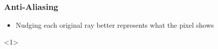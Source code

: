 \documentclass{beamer}
\begin{document}
\begin{frame}[fragile]
	\frametitle{Anti-Aliasing}
	\begin{itemize}
		\item Nudging each original ray better represents what the pixel shows
	\end{itemize}
	\begin{onlyenv}
		\inputminted[fontsize=\small]{python}{scripts/aliasing.py}
	\end{onlyenv}
\end{frame}
\end{document}
